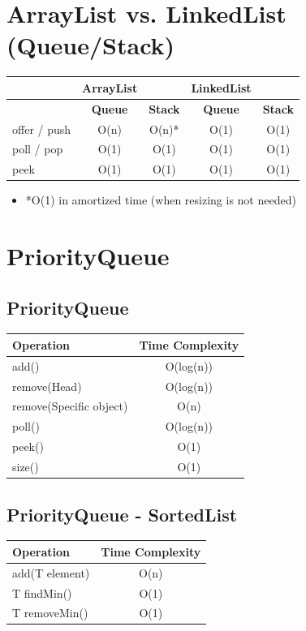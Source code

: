 \documentclass{article}
\begin{document}
\section{ArrayList vs. LinkedList (Queue/Stack)}
\begin{table}[!ht]
\centering
\begin{tabular}{|l|c|c|c|c|}
\hline
& \textbf{ArrayList} & & \textbf{LinkedList} & \\
\hline
& \textbf{Queue} & \textbf{Stack} & \textbf{Queue} & \textbf{Stack} \\
\hline
offer / push & O(n) & O(n)* & O(1) & O(1) \\
\hline
poll / pop & O(1) & O(1) & O(1) & O(1) \\
\hline
peek & O(1) & O(1) & O(1) & O(1) \\
\hline
\end{tabular}
\end{table}
\begin{itemize}
  \item *O(1) in amortized time (when resizing is not needed)
\end{itemize}

\section{PriorityQueue}

\subsection{PriorityQueue}
\begin{table}[!ht]
  \centering
  \begin{tabular}{|l|c|}
  \hline
  \textbf{Operation} & \textbf{Time Complexity} \\
  \hline
  add() & O(log(n))\\
  \hline
  remove(Head) & O(log(n))\\
  \hline
  remove(Specific object) & O(n)\\
  \hline
  poll() & O(log(n))\\
  \hline  
  peek() & O(1)\\
  \hline  
  size() & O(1)\\
  \hline  
  \end{tabular}
  \end{table}

\subsection{PriorityQueue - SortedList}
\begin{table}[!ht]
\centering
\begin{tabular}{|l|c|}
\hline
\textbf{Operation} & \textbf{Time Complexity} \\
\hline
add(T element) & O(n) \\
\hline
T findMin() & O(1) \\
\hline
T removeMin() & O(1) \\
\hline
\end{tabular}
\end{table}
\end{document}
